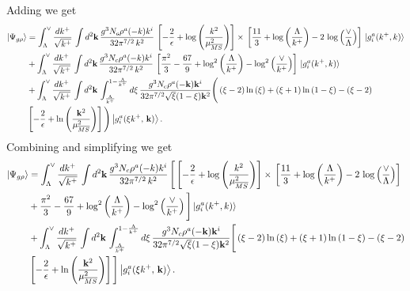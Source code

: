 \documentclass[aps,prd,amsmath,amssymb,nofootinbib]{revtex4-2}
\numberwithin{equation}{section}
\begin{document}
Adding we get
\begin{align}
     \left|\Psi_{g\rho}\right\rangle & =  \int_{\Lambda}^{\vee}\frac{dk^{+}}{\sqrt{k^{+}}}\,\int d^{2}\mathbf{k}\,\frac{g^{3}N_{c}\rho^{a}(-k)k^{i}}{32\pi^{7/2}\,k^{2}}\,\left[-\frac{2}{\epsilon}+\log{\left(\frac{k^{2}}{\mu^{2}_{\overline{MS}}}\right)}\right]\times\, \left[\frac{11}{3}+\log{\left(\frac{\Lambda}{k^{+}}\right)}-2\,\log{\left(\frac{\vee}{\Lambda}\right)}\right]\, \ket{g^{a}_{i}(k^{+},k)}\notag \\ & + \int_{\Lambda}^{\vee}\frac{dk^{+}}{\sqrt{k^{+}}}\,\int d^{2}\mathbf{k}\,\frac{g^{3}N_{c}\rho^{a}(-k)k^{i}}{32\pi^{7/2}\,k^{2}}\, \left[\frac{\pi^{2}}{3} - \frac{67}{9} +\log^{2}\left(\frac{\Lambda}{k^{+}}\right)-\log^{2}\left(\frac{\vee}{k^{+}}\right)\right]\, \ket{g^{a}_{i}(k^{+},k)}\notag \\ & + \int_{\Lambda}^{\vee}\frac{dk^{+}}{\sqrt{k^{+}}}\,\int d^{2}\mathbf{k}\,\int_{\frac{\Lambda}{k^{+}}}^{1-\frac{\Lambda}{k^{+}}}d\xi\,\frac{g^{3}N_{c}\rho^{a}(-\mathbf{k})\mathbf{k}^{i}}{32\pi^{7/2}\sqrt{\xi}(1-\xi)\mathbf{k}^{2}}\Bigg(\left(\xi-2\right)\ln\left(\xi\right)+\left(\xi+1\right)\ln\left(1-\xi\right)-\left(\xi-2\right)\notag \\ & \left[-\frac{2}{\epsilon}+\ln\left(\frac{\mathbf{k}^{2}}{\mu_{\overline{MS}}^{2}}\right)\right]\Bigg)\left|g_{i}^{a}(\xi k^{+},\, \mathbf{k})\right\rangle.
\end{align}
Combining and simplifying we get
\begin{align}\label{combinedgrho}
     \left|\Psi_{g\rho}\right\rangle & =  \int_{\Lambda}^{\vee}\frac{dk^{+}}{\sqrt{k^{+}}}\,\int d^{2}\mathbf{k}\,\frac{g^{3}N_{c}\rho^{a}(-k)k^{i}}{32\pi^{7/2}\,k^{2}}\,\Bigg[\left[-\frac{2}{\epsilon}+\log{\left(\frac{k^{2}}{\mu^{2}_{\overline{MS}}}\right)}\right]\times\, \left[\frac{11}{3}+\log{\left(\frac{\Lambda}{k^{+}}\right)}-2\,\log{\left(\frac{\vee}{\Lambda}\right)}\right]\notag \\ & + \frac{\pi^{2}}{3} - \frac{67}{9} +\log^{2}\left(\frac{\Lambda}{k^{+}}\right)-\log^{2}\left(\frac{\vee}{k^{+}}\right)\Bigg] \ket{g^{a}_{i}(k^{+},k)}\notag \\ & + \int_{\Lambda}^{\vee}\frac{dk^{+}}{\sqrt{k^{+}}}\,\int d^{2}\mathbf{k}\,\int_{\frac{\Lambda}{k^{+}}}^{1-\frac{\Lambda}{k^{+}}}d\xi\,\frac{g^{3}N_{c}\rho^{a}(-\mathbf{k})\mathbf{k}^{i}}{32\pi^{7/2}\sqrt{\xi}(1-\xi)\mathbf{k}^{2}}\Bigg[\left(\xi-2\right)\ln\left(\xi\right)+\left(\xi+1\right)\ln\left(1-\xi\right)-\left(\xi-2\right)\notag \\ & \left[-\frac{2}{\epsilon}+\ln\left(\frac{\mathbf{k}^{2}}{\mu_{\overline{MS}}^{2}}\right)\right]\Bigg]\left|g_{i}^{a}(\xi k^{+},\, \mathbf{k})\right\rangle.
\end{align}
\end{document}
